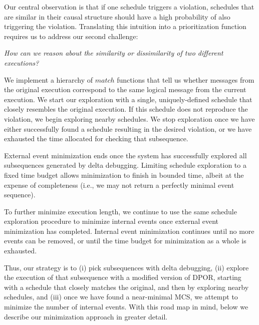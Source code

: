 Our central observation is that if one schedule triggers a violation,
schedules that are similar in their causal structure should have a high probability
of also triggering the violation. Translating this intuition into
a prioritization function requires us to address our second
challenge:

\begin{displayquote}
{\em How can we reason about the similarity or dissimilarity of two different
executions?}
\end{displayquote}

We implement a hierarchy of $match$ functions that tell us whether messages
from the original execution correspond to the same logical message from the current execution.
We start our exploration with a single,
uniquely-defined schedule that closely resembles the original execution.
If this schedule does not reproduce the violation, we begin exploring
nearby schedules. %
We stop exploration once we have either
successfully found a schedule resulting in
the desired violation, or we have exhausted the time allocated for
checking that subsequence.

External event minimization ends once the system has successfully explored all subsequences generated by delta debugging. Limiting schedule exploration to a fixed
time budget allows minimization to finish in bounded time, albeit at the
expense of completeness (i.e., we may not return a perfectly minimal event sequence).

To further minimize execution length, we continue to use the same schedule exploration procedure
to minimize internal events once external event minimization has
completed. Internal event minimization continues until no more events
can be removed, or until the time budget for minimization as a whole is exhausted.

Thus, our strategy is to (i) pick subsequences with
delta debugging, (ii) explore the execution of
that subsequence with a modified version of DPOR, starting with a schedule that closely matches the
original, and then by exploring nearby schedules, and
(iii) once we have found a near-minimal MCS, we attempt
to minimize the number of internal events.
With this road map in mind, below we describe our
minimization approach in
greater detail.


